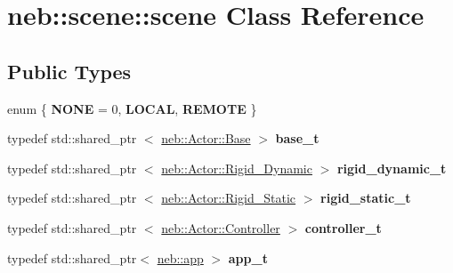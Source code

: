 \hypertarget{classneb_1_1scene_1_1scene}{\section{neb\-:\-:scene\-:\-:scene \-Class \-Reference}
\label{classneb_1_1scene_1_1scene}
}
\subsection*{\-Public \-Types}
\begin{DoxyCompactItemize}
\item 
enum \{ {\bfseries \-N\-O\-N\-E} =  0, 
{\bfseries \-L\-O\-C\-A\-L}, 
{\bfseries \-R\-E\-M\-O\-T\-E}
 \}
\item 
\hypertarget{classneb_1_1scene_1_1scene_a93173acffbdc556f0a641cd221c54a5a}{typedef std\-::shared\-\_\-ptr\*
$<$ \hyperlink{classneb_1_1Actor_1_1Base}{neb\-::\-Actor\-::\-Base} $>$ {\bfseries base\-\_\-t}}\label{classneb_1_1scene_1_1scene_a93173acffbdc556f0a641cd221c54a5a}

\item 
\hypertarget{classneb_1_1scene_1_1scene_a67e04f8f35aa73c9fd192d9c4fbe403c}{typedef std\-::shared\-\_\-ptr\*
$<$ \hyperlink{classneb_1_1Actor_1_1Rigid__Dynamic}{neb\-::\-Actor\-::\-Rigid\-\_\-\-Dynamic} $>$ {\bfseries rigid\-\_\-dynamic\-\_\-t}}\label{classneb_1_1scene_1_1scene_a67e04f8f35aa73c9fd192d9c4fbe403c}

\item 
\hypertarget{classneb_1_1scene_1_1scene_a5ffbe126690d92a6a21821b5770f085e}{typedef std\-::shared\-\_\-ptr\*
$<$ \hyperlink{classneb_1_1Actor_1_1Rigid__Static}{neb\-::\-Actor\-::\-Rigid\-\_\-\-Static} $>$ {\bfseries rigid\-\_\-static\-\_\-t}}\label{classneb_1_1scene_1_1scene_a5ffbe126690d92a6a21821b5770f085e}

\item 
\hypertarget{classneb_1_1scene_1_1scene_afbea2ea9e297eb5a6b35e94ab71555b8}{typedef std\-::shared\-\_\-ptr\*
$<$ \hyperlink{classneb_1_1Actor_1_1Controller}{neb\-::\-Actor\-::\-Controller} $>$ {\bfseries controller\-\_\-t}}\label{classneb_1_1scene_1_1scene_afbea2ea9e297eb5a6b35e94ab71555b8}

\item 
\hypertarget{classneb_1_1scene_1_1scene_a91d267e955478e0ae15693eb49103e3c}{typedef std\-::shared\-\_\-ptr$<$ \hyperlink{classneb_1_1app}{neb\-::app} $>$ {\bfseries app\-\_\-t}}\label{classneb_1_1scene_1_1scene_a91d267e955478e0ae15693eb49103e3c}

\end{DoxyCompactItemize}
